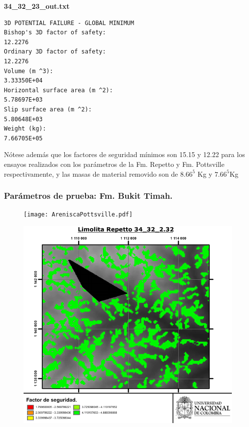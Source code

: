 \begin{center}

\textbf{34\_32\_23\_out.txt}
\begin{verbatim}
3D POTENTIAL FAILURE - GLOBAL MINIMUM
Bishop's 3D factor of safety:                                          12.2276
Ordinary 3D factor of safety:                                          12.2276
Volume (m ^3):                                                     3.33350E+04
Horizontal surface area (m ^2):                                    5.78697E+03
Slip surface area (m ^2):                                          5.80648E+03
Weight (kg):                                                       7.66705E+05
\end{verbatim}

\end{center}
N\'otese adem\'as que los factores de seguridad m\'inimos son 15.15 y 12.22 para los ensayos realizados con los par\'ametros de la Fm. Repetto y Fm. Pottsville respectivamente, y las masas de material removido son de $8.66^{5}$ Kg y $7.66^{5}$Kg

\subsubsection{Par\'ametros de prueba: Fm. Bukit Timah.}
\begin{figure}[H]
\centering
\begin{minipage}{.45\linewidth}
  \texttt{[image: AreniscaPottsville.pdf]}
  \label{fig:pottsville}
\end{minipage}
\hspace{.05\linewidth}
\begin{minipage}{.45\linewidth}
  \includegraphics[width=\linewidth]{img/LimolitaRepetto34_32_232.pdf}
  \label{fig:repetto}
\end{minipage}
\end{figure}

